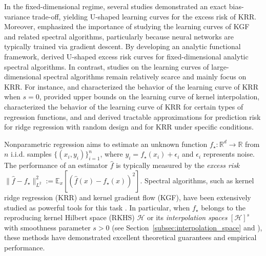 \documentclass{article}
\theoremstyle{plain}
\theoremstyle{definition}
\theoremstyle{remark}
\begin{document}
In the fixed-dimensional regime, several studies \citep{Bordelon_Spectrum_2020, Cui2021GeneralizationER, jin2021learning, li2023asymptotic, cheng2024comprehensive} demonstrated an exact bias-variance trade-off, yielding U-shaped learning curves for the excess risk of KRR. 
Moreover, \cite{li2024generalization} emphasized the importance of studying the learning curves of KGF and related spectral algorithms, particularly because neural networks are typically trained via gradient descent. By developing an analytic functional framework, \cite{li2024generalization} derived U-shaped excess risk curves for fixed-dimensional analytic spectral algorithms.
In contrast, studies on the learning curves of large-dimensional spectral algorithms remain relatively scarce and mainly focus on KRR. 
For instance, 
\cite{xiao2022precise} and \cite{ mei2022generalization} characterized the behavior of the learning curve of KRR when $s=0$, 
\cite{barzilai2023generalization} provided upper bounds on the learning curve of kernel interpolation, 
\cite{aerni2023strong} characterized the behavior of the learning curve of KRR for certain types of regression functions,
and \cite{cheng2022dimension} and \cite{misiakiewicz2024non} derived tractable approximations for prediction risk for ridge regression with random design and for KRR under specific conditions.

\iffalse %
\newpage 
\color{blue}
Nonparametric regression aims to estimate an unknown function $f_{\star}: \mathbb{R}^d \to \mathbb{R}$ from $n$ i.i.d. samples $\{(x_i, y_i)\}_{i=1}^n$, where $y_i = f_{\star}(x_i) + \epsilon_i$ and $\epsilon_i$ represents noise. 
The performance of an estimator $\hat{f}$ is typically measured by the \textit{excess risk} $\|\hat{f} - f_{\star}\|_{L^2}^2 := \mathbb{E}_x[(\hat{f}(x) - f_{\star}(x) )^2]$. 
Spectral algorithms, such as kernel ridge regression (KRR) and kernel gradient flow (KGF), have been extensively studied as powerful tools for this task \citep{Caponnetto2006OptimalRF, caponnetto2007optimal}. 
In particular, when $f_{\star}$ belongs to the reproducing kernel Hilbert space (RKHS) $\mathcal{H}$ \citep{Caponnetto2006OptimalRF, caponnetto2007optimal, Yao2007OnES, raskutti2014early, Liang_Just_2019} or its \emph{interpolation spaces} $[\mathcal{H}]^s$ with smoothness parameter $s > 0$ (see Section~\ref{subsec:interpolation_space} and \citet*{fischer2020_SobolevNorm, zhang2023optimality, zhang2023optimality_2,zhang2024optimal}), these methods have demonstrated excellent theoretical guarantees and empirical performance.
\end{document}
